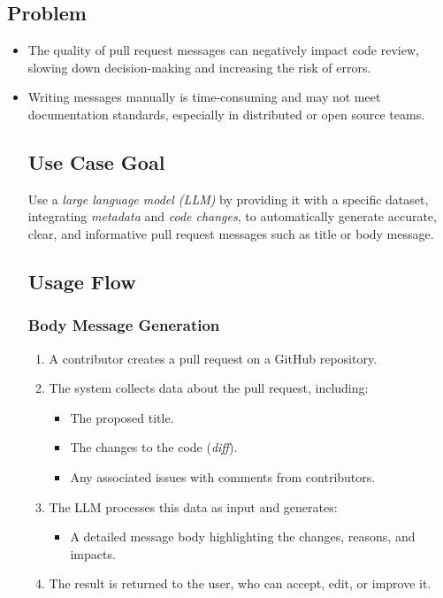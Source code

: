 \subsection{Problem}
\begin{itemize}
\item The quality of pull request messages can negatively impact code review, slowing down decision-making and increasing the risk of errors.
\item Writing messages manually is time-consuming and may not meet documentation standards, especially in distributed or open source teams.
\subsection{Use Case Goal}
Use a \textit{large language model (LLM)} by providing it with a specific dataset, integrating \textit{metadata} and \textit{code changes}, to automatically generate accurate, clear, and informative pull request messages such as title or body message.
\subsection{Usage Flow}
\subsubsection{Body Message Generation}
\begin{enumerate}
\item A contributor creates a pull request on a GitHub repository.
\item The system collects data about the pull request, including:
\begin{itemize}
\item The proposed title.
\item The changes to the code (\textit{diff}).
\item Any associated issues with comments from contributors.
\end{itemize}
\item The LLM processes this data as input and generates:
\begin{itemize}
\item A detailed message body highlighting the changes, reasons, and impacts.
\end{itemize}
\item The result is returned to the user, who can accept, edit, or improve it.
\end{enumerate}

\end{itemize}

